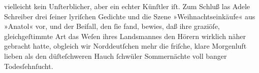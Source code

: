 {{                  vielleicht kein Unſterblicher, aber ein echter Künſtler iſt. Zum Schluß las Adele Schreiber drei ſeiner lyriſchen
                  Gedichte und die Szene »Weihnachtseinkäufe«
                  aus »Anatol« vor, und der Beifall, den ſie
                  fand, bewies, daß ihre graziöſe, gleichgeſtimmte Art das Weſen ihres Landsmannes den Hörern
                  wirklich näher gebracht hatte, obgleich wir Norddeutſchen mehr die friſche, klare Morgenluft lieben als den
                  düſteſchweren Hauch ſchwüler Sommernächte voll banger Todesſehnſucht.}}\pend
           \endnumbering{}  
      